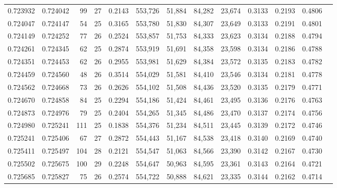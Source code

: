\begin{tabular}{rrrrrrrrrrrrr}
0.723932 & 0.724042 &    99 &  27 &                                     0.2143 & 553,726 &  51,884 &  84,282 &  23,674 & 0.3133 & 0.2193 & 0.4806 \\
0.724047 & 0.724147 &    54 &  25 &                                     0.3165 & 553,780 &  51,830 &  84,307 &  23,649 & 0.3133 & 0.2191 & 0.4801 \\
0.724149 & 0.724252 &    77 &  26 &                                     0.2524 & 553,857 &  51,753 &  84,333 &  23,623 & 0.3134 & 0.2188 & 0.4794 \\
0.724261 & 0.724345 &    62 &  25 &                                     0.2874 & 553,919 &  51,691 &  84,358 &  23,598 & 0.3134 & 0.2186 & 0.4788 \\
0.724351 & 0.724453 &    62 &  26 &                                     0.2955 & 553,981 &  51,629 &  84,384 &  23,572 & 0.3135 & 0.2183 & 0.4782 \\
0.724459 & 0.724560 &    48 &  26 &                                     0.3514 & 554,029 &  51,581 &  84,410 &  23,546 & 0.3134 & 0.2181 & 0.4778 \\
0.724562 & 0.724668 &    73 &  26 &                                     0.2626 & 554,102 &  51,508 &  84,436 &  23,520 & 0.3135 & 0.2179 & 0.4771 \\
0.724670 & 0.724858 &    84 &  25 &                                     0.2294 & 554,186 &  51,424 &  84,461 &  23,495 & 0.3136 & 0.2176 & 0.4763 \\
0.724873 & 0.724976 &    79 &  25 &                                     0.2404 & 554,265 &  51,345 &  84,486 &  23,470 & 0.3137 & 0.2174 & 0.4756 \\
0.724980 & 0.725241 &   111 &  25 &                                     0.1838 & 554,376 &  51,234 &  84,511 &  23,445 & 0.3139 & 0.2172 & 0.4746 \\
0.725241 & 0.725406 &    67 &  27 &                                     0.2872 & 554,443 &  51,167 &  84,538 &  23,418 & 0.3140 & 0.2169 & 0.4740 \\
0.725411 & 0.725497 &   104 &  28 &                                     0.2121 & 554,547 &  51,063 &  84,566 &  23,390 & 0.3142 & 0.2167 & 0.4730 \\
0.725502 & 0.725675 &   100 &  29 &                                     0.2248 & 554,647 &  50,963 &  84,595 &  23,361 & 0.3143 & 0.2164 & 0.4721 \\
0.725685 & 0.725827 &    75 &  26 &                                     0.2574 & 554,722 &  50,888 &  84,621 &  23,335 & 0.3144 & 0.2162 & 0.4714 \\

\end{tabular}

